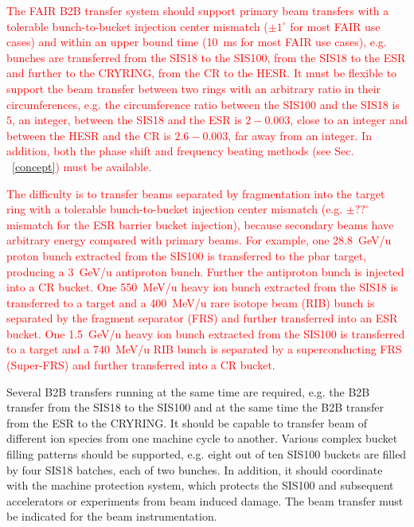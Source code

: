\textcolor{red}{The FAIR B2B transfer system should support primary beam transfers with a tolerable bunch-to-bucket injection center mismatch ($\pm 1^\circ$ for most FAIR use cases) and within an upper bound time (\SI{10}{\ms} for most FAIR use cases), e.g. bunches are transferred from the SIS18 to the SIS100, from the SIS18 to the ESR  and further to the CRYRING, from the CR to the HESR. It must be flexible to support the beam transfer between two rings with an arbitrary ratio in their circumferences, e.g. the circumference ratio between the SIS100 and the SIS18 is $5$, an integer, between the SIS18 and the ESR is $2 - 0.003$, close to an integer and between the HESR and the CR is $2.6 - 0.003$, far away from an integer. In addition, both the phase shift and frequency beating methods (see Sec. ~\ref{concept}) must be available. }

\textcolor{red}{The difficulty is to transfer beams separated by fragmentation into the target ring with a tolerable bunch-to-bucket injection center mismatch (e.g. $\pm ??^\circ$ mismatch for the ESR barrier bucket injection), because secondary beams have arbitrary energy compared with primary beams. For example, one \SI{28.8}{GeV/u} proton bunch extracted from the SIS100 is transferred to the pbar target, producing a \SI{3}{GeV/u} antiproton bunch. Further the antiproton bunch is injected into a CR bucket. One \SI{550}{MeV/u} heavy ion bunch extracted from the SIS18 is transferred to a target and a \SI{400}{MeV/u} rare isotope beam (RIB) bunch is separated by the fragment separator (FRS) and further transferred into an ESR bucket. One \SI{1.5}{GeV/u} heavy ion bunch extracted from the SIS100 is transferred to a target and a \SI{740}{MeV/u} RIB bunch is separated by a superconducting FRS (Super-FRS) and further transferred into a CR bucket.}


Several B2B transfers running at the same time are required, e.g. the B2B transfer from the SIS18 to the SIS100 and at the same time the B2B transfer from the ESR to the CRYRING. It should be capable to transfer beam of different ion species from one machine cycle to another. Various complex bucket filling patterns should be supported, e.g. eight out of ten SIS100 buckets are filled by four SIS18 batches, each of two bunches. In addition, it should coordinate with the machine protection system, which protects the SIS100 and subsequent accelerators or experiments from beam induced damage. The beam transfer must be indicated for the beam instrumentation.